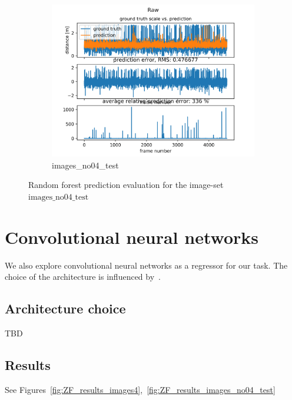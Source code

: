 \documentclass{article}
\begin{document}
\begin{figure}[h!]
	\begin{subfigure}{.5\textwidth}
		\includegraphics[width=\linewidth]{images_no04_test_raw}
		\caption{images\_no04\_test}
		\label{fig:ETR_images_no04_test}
	\end{subfigure}
	\caption{Random forest prediction evaluation for the image-set $\mathrm{images\_no04\_test}$}
	\label{fig:forest_results_images_no04_test}
\end{figure}

\section{Convolutional neural networks}

We also explore convolutional neural networks as a regressor for our
task.  The choice of the architecture is influenced
by~\cite{fischer2015flownet}.

\subsection{Architecture choice}
TBD

\subsection{Results}
See Figures~\ref{fig:ZF_results_images4},~\ref{fig:ZF_results_images_no04_test}
\end{document}
